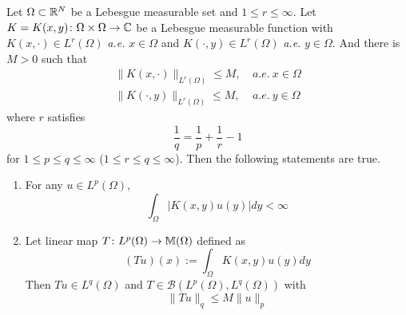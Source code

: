 \begin{thm}\label{thm:strongkernel}
	Let $\Omega \subset \mathbb{R}^N$ be a Lebesgue measurable set and $1 \leq r \leq \infty$. Let $K = K(x,y) \colon \Omega \times \Omega \rightarrow \mathbb{C}$ be a Lebesgue measurable function with $K(x,\cdot) \in L^r(\Omega)$ \emph{a.e.} $x \in \Omega$ and $K(\cdot, y) \in L^r(\Omega)$ \emph{a.e.} $y \in \Omega$. And there is $M > 0$ such that
	\begin{equation*}
		\begin{aligned}
			\|K(x, \cdot)\|_{L^r(\Omega)} \leq M, &~ a.e.~x \in \Omega\\
			\|K(\cdot, y)\|_{L^r(\Omega)} \leq M, &~ a.e.~y \in \Omega
		\end{aligned}
	\end{equation*}
	where $r$ satisfies
	\begin{equation*}
		\frac{1}{q}=\frac{1}{p}+\frac{1}{r}-1
	\end{equation*}
	for $1 \leq p\leq q \leq \infty$ ($1 \leq r \leq q \leq \infty$). Then the following statements are true.
	\begin{enumerate}[label = (\arabic{*})]
		\item For any $u \in L^p(\Omega)$,
		\begin{equation*}
			\int_{\Omega}|K(x, y) u(y)| d y<\infty
		\end{equation*}
		\item Let linear map $T \colon L^p(\Omega) \rightarrow \mathbb{M}(\Omega)$ defined as
		\begin{equation*}
			(T u)(x):=\int_{\Omega} K(x, y) u(y) d y
		\end{equation*}
		Then $Tu \in L^q(\Omega)$ and $T \in \mathcal{B}\left(L^p(\Omega), L^q(\Omega)\right)$ with
		\begin{equation*}
			\|T u\|_{q} \leq M\|u\|_{p}
		\end{equation*}
	\end{enumerate}
\end{thm}
